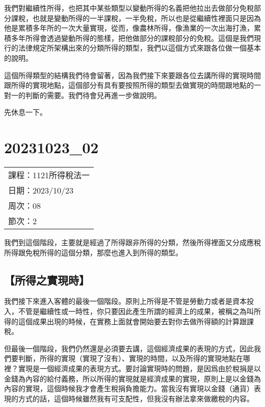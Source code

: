 \documentclass[]{ctexbook}
\begin{document}
我們對繼續性所得，也把其中某些類型以變動所得的名義把他拉出去做部分免稅部分課稅，也就是變動所得的一半課稅，一半免稅，所以也是從繼續性裡面只是因為他是累積多年所的一次大量實現，從而，像農林所得，像漁業的一次出海打漁，累積多年所得會透過變動所得的態樣，把他做部分的課稅部分的免稅。這個是我們現行的法律規定所架構出來的分類所得的類型，我們以這個方式來跟各位做一個基本的說明。

這個所得類型的結構我們待會留著，因為我們接下來要跟各位去講所得的實現時間跟所得的實現地點，這個部分有具有要按照所得的類型去做實現的時間跟地點的一對一的判斷的需要。我們待會兒再進一步做說明。

先休息一下。

\hypertarget{section-14}{%
\chapter{20231023\_02}\label{section-14}}

\begin{longtable}[]{@{}l@{}}
\toprule()
\endhead
課程：1121所得稅法一 \\
日期：2023/10/23 \\
周次：08 \\
節次：2 \\
\bottomrule()
\end{longtable}

我們到這個階段，主要就是經過了所得跟非所得的分類，然後所得裡面又分成應稅所得跟免稅所得的這個分類，那麼也進入到所得的類型。

\hypertarget{ux6240ux5f97ux4e4bux5be6ux73feux6642}{%
\section{【所得之實現時】}\label{ux6240ux5f97ux4e4bux5be6ux73feux6642}}

我們接下來進入客體的最後一個階段。原則上所得是不管是勞動力或者是資本投入，不管是繼續性或一時性，你只要因此產生所謂的經濟上的成果，被稱之為叫所得的這個成果出現的時候，在實務上面就會開始要去對你去做所得額的計算跟課稅。

但最後一個階段，我們仍然還是必須要去講，這個經濟成果的表現的方式，因此我們要判斷，所得的實現（實現了沒有）、實現的時間，以及所得的實現地點在哪裡？實現是一個經濟成果的表現方式。要討論實現時的問題，是因爲由於稅捐是以金錢為內容的給付義務，所以所得的實現就是經濟成果的實現，原則上是以金錢為內容的實現，這個時候我才會產生稅捐負擔能力。當我沒有實現以金錢（通貨）表現的方式的話，這個時候雖然我有可支配性，但我沒有辦法拿來做繳稅的内容。
\end{document}
